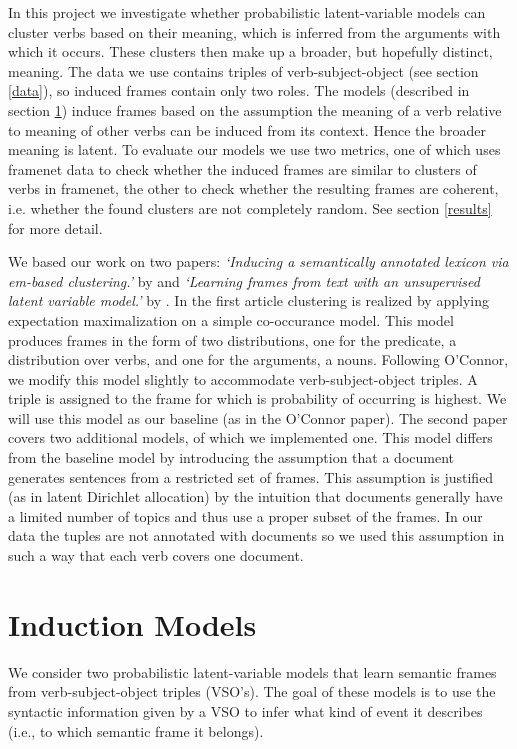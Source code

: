 \documentclass{article} %
\begin{document}
In this project we investigate whether probabilistic latent-variable models can cluster verbs based on their meaning, which is inferred from the arguments with which it occurs. These clusters then make up a broader, but hopefully distinct, meaning. The data we use contains triples of verb-subject-object (see section \ref{data}), so induced frames contain only two roles. The models (described in section \ref{models}) induce frames based on the assumption the meaning of a verb relative to meaning of other verbs can be induced from its context. Hence the broader meaning is latent. To evaluate our models we use two metrics, one of which uses framenet data to check whether the induced frames are similar to clusters of verbs in framenet, the other to check whether the resulting frames are coherent, i.e. whether the found clusters are not completely random. See section \ref{results} for more detail.

We based our work on two papers: \textit{`Inducing a semantically annotated lexicon via em-based clustering.'} by \citeauthor{rooth1999} and \textit{`Learning frames from text with an unsupervised latent variable model.'} by \citeauthor{oconnor2013}. In the first article clustering is realized by applying expectation maximalization on a simple co-occurance model. This model produces frames in the form of two distributions, one for the predicate, a distribution over verbs, and one for the arguments, a nouns. Following O'Connor, we modify this model slightly to accommodate verb-subject-object triples. A triple is assigned to the frame for which is probability of occurring is highest. We will use this model as our baseline (as in the O'Connor paper). The second paper covers two additional models, of which we implemented one. This model differs from the baseline model by introducing the assumption that a document generates sentences from a restricted set of frames. This assumption is justified (as in latent Dirichlet allocation) \cite{blei2003} by the intuition that documents generally have a limited number of topics and thus use a proper subset of the frames. In our data the tuples are not annotated with documents so we used this assumption in such a way that each verb covers one document.  


\section{Induction Models}
\label{models}
We consider two probabilistic latent-variable models that learn semantic frames
from verb-subject-object triples (VSO's).
The goal of these models is to use the syntactic information given by a VSO to
infer what kind of event it describes (i.e., to which semantic frame it belongs).
\end{document}
